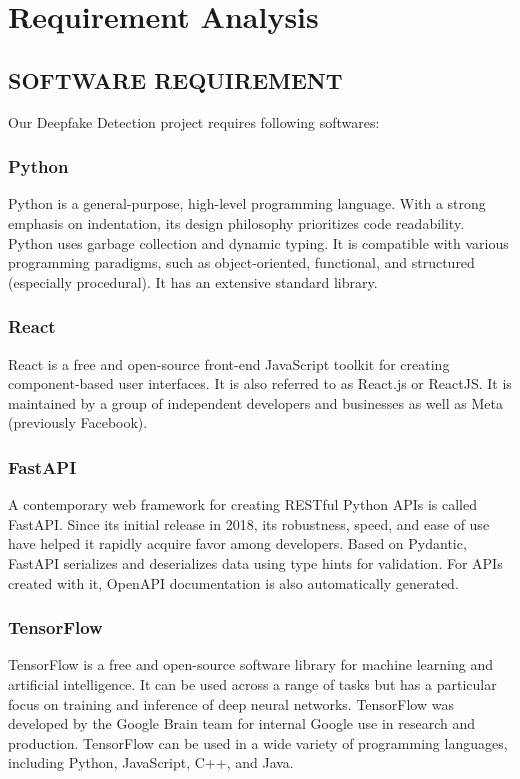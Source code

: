       \chapter{Requirement Analysis}
        \section{SOFTWARE REQUIREMENT}
            Our Deepfake Detection project requires following softwares:
            \subsection{Python}
                Python is a general-purpose, high-level programming language. With a strong emphasis on indentation, its design philosophy prioritizes code readability. Python uses garbage collection and dynamic typing. It is compatible with various programming paradigms, such as object-oriented, functional, and structured (especially procedural). It has an extensive standard library.

            \subsection{React}
                React is a free and open-source front-end JavaScript toolkit for creating component-based user interfaces. It is also referred to as React.js or ReactJS. It is maintained by a group of independent developers and businesses as well as Meta (previously Facebook).

            \subsection{FastAPI}
                A contemporary web framework for creating RESTful Python APIs is called FastAPI. Since its initial release in 2018, its robustness, speed, and ease of use have helped it rapidly acquire favor among developers. Based on Pydantic, FastAPI serializes and deserializes data using type hints for validation. For APIs created with it, OpenAPI documentation is also automatically generated.

            \subsection{TensorFlow}
                TensorFlow is a free and open-source software library for machine learning and artificial intelligence. It can be used across a range of tasks but has a particular focus on training and inference of deep neural networks. TensorFlow was developed by the Google Brain team for internal Google use in research and production. TensorFlow can be used in a wide variety of programming languages, including Python, JavaScript, C++, and Java.

